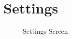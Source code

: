 \documentclass[
    DIV12,
    cleardouble=plain,
    headings=normal,
    pdftex,
    headexclude,footexclude,
    final
]{scrreprt}
\begin{document}
\section{Settings}
\begin{figure}[H]
	\centering
	\caption{Settings Screen}
	\label{settings}
\end{figure}
\end{document}
